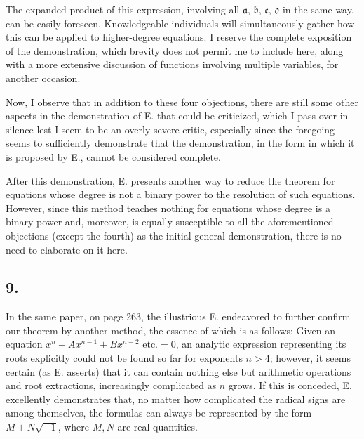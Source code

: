 \documentclass[12pt]{memoir}
\theoremstyle{plain}
\theoremstyle{remark}
\begin{document}
The expanded product of this expression, involving all \(\mathfrak{a}\), \(\mathfrak{b}\), \(\mathfrak{c}\), \(\mathfrak{d}\) in the same way, can be easily foreseen. Knowledgeable individuals will simultaneously gather how this can be applied to higher-degree equations. I reserve the complete exposition of the demonstration, which brevity does not permit me to include here, along with a more extensive discussion of functions involving multiple variables, for another occasion.

Now, I observe that in addition to these four objections, there are still some other aspects in the demonstration of \textsc{E.} that could be criticized, which I pass over in silence lest I seem to be an overly severe critic, especially since the foregoing seems to sufficiently demonstrate that the demonstration, in the form in which it is proposed by \textsc{E.}, cannot be considered complete.

After this demonstration, \textsc{E.} presents another way to reduce the theorem for equations whose degree is not a binary power to the resolution of such equations. However, since this method teaches nothing for equations whose degree is a binary power and, moreover, is equally susceptible to all the aforementioned objections (except the fourth) as the initial general demonstration, there is no need to elaborate on it here.

\subsection*{9.}

In the same paper, on page 263, the illustrious \textsc{E.} endeavored to further confirm our theorem by another method, the essence of which is as follows: Given an equation \(x^n + Ax^{n-1} + B x^{n-2} \text{ etc.} = 0\), an analytic expression representing its roots explicitly could not be found so far for exponents \(n>4\); however, it seems certain (as \textsc{E.} asserts) that it can contain nothing else but arithmetic operations and root extractions, increasingly complicated as \(n\) grows. If this is conceded, \textsc{E.} excellently demonstrates that, no matter how complicated the radical signs are among themselves, the formulas can always be represented by the form \(M+N\surd{-1}\), where \(M, N\) are real quantities.
\end{document}
